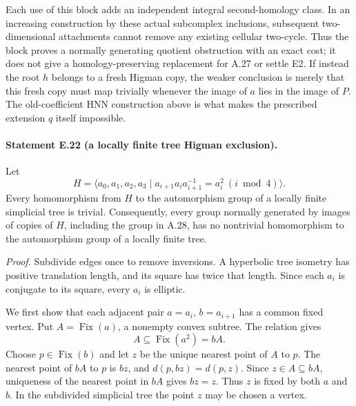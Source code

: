 Each use of this block adds an independent integral second-homology
class. In an increasing construction by these actual subcomplex
inclusions, subsequent two-dimensional attachments cannot remove
any existing cellular two-cycle. Thus the block proves a normally generating quotient
obstruction with an exact cost; it does not give a homology-preserving
replacement for A.27 or settle E2. If instead the root $h$ belongs
to a fresh Higman copy, the weaker conclusion is merely that this
fresh copy must map trivially whenever the image of $a$ lies in the
image of $P$. The old-coefficient HNN construction above is what
makes the prescribed extension $q$ itself impossible.


\paragraph{Statement E.22 (a locally finite tree Higman exclusion).}
Let
\[
 H=\langle a_0,a_1,a_2,a_3\mid
       a_{i+1}a_i a_{i+1}^{-1}=a_i^2\ (i\bmod4)\rangle.
\]
Every homomorphism from $H$ to the automorphism group of a locally
finite simplicial tree is trivial. Consequently, every group normally generated by images
of copies of $H$, including the group in A.28, has no nontrivial homomorphism
to the automorphism group of a locally finite tree.

\emph{Proof.}
Subdivide edges once to remove inversions. A hyperbolic tree isometry
has positive translation length, and its square has twice that length.
Since each $a_i$ is conjugate to its square, every $a_i$ is elliptic.

We first show that each adjacent pair $a=a_i$, $b=a_{i+1}$ has a
common fixed vertex. Put $A=\operatorname{Fix}(a)$, a nonempty convex
subtree. The relation gives
\[
 A\subseteq\operatorname{Fix}(a^2)=bA.
\]
Choose $p\in\operatorname{Fix}(b)$ and let $z$ be the unique nearest
point of $A$ to $p$. The nearest point of $bA$ to $p$ is $bz$, and
$d(p,bz)=d(p,z)$. Since $z\in A\subseteq bA$, uniqueness of the
nearest point in $bA$ gives $bz=z$. Thus $z$ is fixed by both $a$ and $b$.
In the subdivided simplicial tree the point $z$ may be chosen a vertex.


